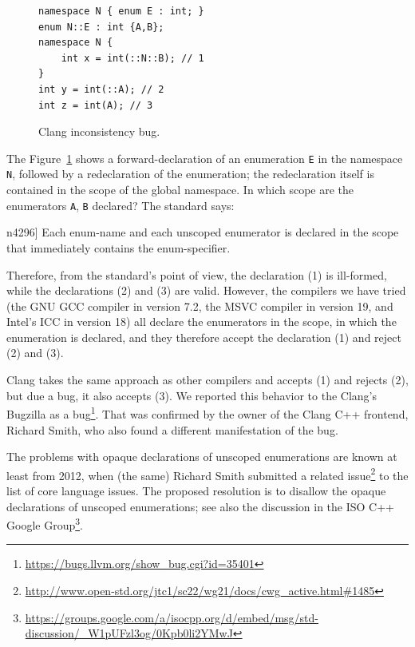 \documentclass[nolot,nolof,nocover,printed]{fithesis3}
\newcommand{\stdN}[2]{\cite[#2]{#1}\xspace}
\begin{document}
\begin{figure}
\begin{lstlisting}
namespace N { enum E : int; }
enum N::E : int {A,B};
namespace N {
    int x = int(::N::B); // 1
}
int y = int(::A); // 2
int z = int(A); // 3
\end{lstlisting}
\caption{Clang inconsistency bug.}
\label{fig:clangInconsistencyBug}
\end{figure}

The Figure~\ref{fig:clangInconsistencyBug} shows a forward-declaration of an enumeration \texttt{E} in the namespace \texttt{N}, followed by a redeclaration of the enumeration; the redeclaration itself is contained in the scope of the global namespace. In which scope are the enumerators \texttt{A}, \texttt{B} declared? The standard says:
\begin{displayquote}[\stdN{n4296}{\S 7.2/11}]
Each enum-name and each unscoped enumerator is declared in the scope that immediately contains the
enum-specifier.
\end{displayquote}
Therefore, from the standard's point of view, the declaration (1) is ill-formed, while the declarations (2) and (3) are valid. However, the compilers we have tried (the GNU GCC compiler in version 7.2, the MSVC compiler in version 19, and Intel's ICC in version 18) all declare the enumerators in the scope, in which the enumeration is declared, and they therefore accept the declaration (1) and reject (2) and (3).

Clang takes the same approach as other compilers and accepts (1) and rejects (2), but due a bug, it also accepts (3). We reported this behavior to the Clang's Bugzilla as a bug\footnote{\url{https://bugs.llvm.org/show_bug.cgi?id=35401}}. That was confirmed by the owner of the Clang C++ frontend, Richard Smith, who also found a different manifestation of the bug.

The problems with opaque declarations of unscoped enumerations are known at least from 2012, when (the same) Richard Smith submitted a related issue\footnote{\url{http://www.open-std.org/jtc1/sc22/wg21/docs/cwg\_active.html\#1485}} to the list of core language issues. The proposed resolution is to disallow the opaque declarations of unscoped enumerations; see also the discussion in the ISO C++ Google Group\footnote{\url{https://groups.google.com/a/isocpp.org/d/embed/msg/std-discussion/\_W1pUFzl3og/0Kpb0li2YMwJ}}.

\end{document}
